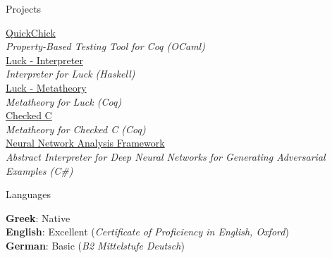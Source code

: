 \documentclass{resume} %
\begin{document}

\begin{rSection}{Projects}

  \href{https://github.com/QuickChick/QuickChick}{QuickChick}\\
  \hspace*{2em} \emph{Property-Based Testing Tool for Coq (OCaml)}\\
  \href {https://github.com/QuickChick/Luck/tree/master/luck}{Luck - Interpreter}\\
  \hspace*{2em} \emph{Interpreter for Luck (Haskell)}\\
  \href{https://github.com/QuickChick/Luck/tree/master/coq}{Luck - Metatheory}\\
  \hspace*{2em} \emph{Metatheory for Luck (Coq)}\\
  \href{https://github.com/plum-umd/checkedc/tree/master/coq}{Checked C}\\
  \hspace*{2em} \emph{Metatheory for Checked C (Coq)}\\
  \href{https://github.com/microsoft/NeuralNetworkAnalysis}{Neural Network Analysis Framework}\\
  \hspace*{2em} \emph{Abstract Interpreter for Deep Neural Networks for Generating Adversarial Examples (C\#)}

\end{rSection}

\begin{rSection}{Languages}

  {\bf Greek}: Native \\
  {\bf English}: Excellent ({\em Certificate of Proficiency in English, Oxford})\\
  {\bf German}: Basic ({\em B2 Mittelstufe Deutsch})\\
\end{rSection}



\end{document}
